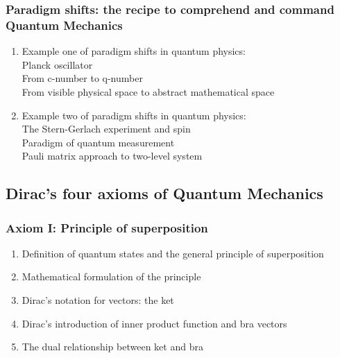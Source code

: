 \documentclass[12pt]{article}
\numberwithin{equation}{section}
\begin{document}
\subsubsection{Paradigm shifts: the recipe to comprehend and command Quantum Mechanics}
\begin{enumerate}
\item Example one of paradigm shifts in quantum physics:\\
	Planck oscillator\\
     	From c-number to q-number \\
	From visible physical space to abstract mathematical space 
\item Example two of paradigm shifts in quantum physics: \\
	The Stern-Gerlach experiment and spin\\
	Paradigm of quantum measurement \\
	Pauli matrix approach to two-level system
\end{enumerate}
\subsection{Dirac's four axioms of Quantum Mechanics}
\subsubsection{Axiom I: Principle of superposition}
\begin{enumerate}
\item Definition of quantum states and the general principle of superposition
\item Mathematical formulation of the principle
\item Dirac's notation for vectors: the ket
\item Dirac's introduction of inner product function and bra vectors
\item The dual relationship between ket and bra
\end{enumerate}
\end{document}
